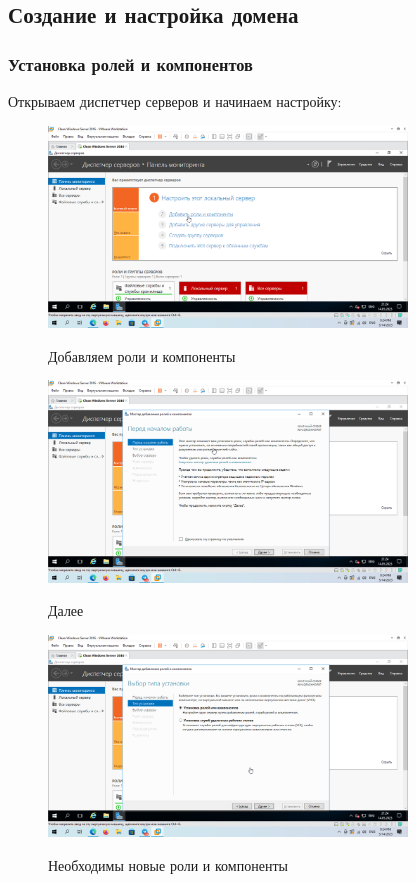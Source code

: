 \documentclass[a4paper]{article}
\begin{document}
  \subsection{Создание и настройка домена}

  \subsubsection{Установка ролей и компонентов}

  Открываем диспетчер серверов и начинаем настройку:

  \begin{figure}[H]
    \centering
    \includegraphics[width=0.85\textwidth]{5_0028}
    \label{img:28}
    \caption{Добавляем роли и компоненты}
  \end{figure}

  \begin{figure}[H]
    \centering
    \includegraphics[width=0.85\textwidth]{5_0029}
    \label{img:29}
    \caption{Далее}
  \end{figure}

  \begin{figure}[H]
    \centering
    \includegraphics[width=0.85\textwidth]{5_0030}
    \label{img:30}
    \caption{Необходимы новые роли и компоненты}
  \end{figure}
\end{document}
